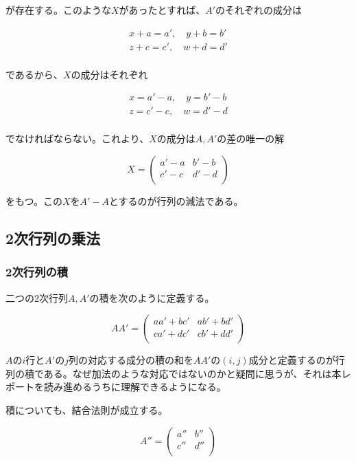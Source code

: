 \documentclass[dvipdfmx,autodetect-engine]{jsarticle}
\begin{document}
が存在する。このような$X$があったとすれば、$A'$のそれぞれの成分は

\begin{eqnarray*}
x + a = a', \quad y + b = b' \\
z + c = c', \quad w + d = d' \\
\end{eqnarray*}

であるから、$X$の成分はそれぞれ

\begin{eqnarray*}
x = a' - a, \quad y = b' - b \\
z = c' - c, \quad w = d' - d \\
\end{eqnarray*}

でなければならない。これより、$X$の成分は$A, A'$の差の唯一の解


$$
X = \begin{pmatrix}
a' - a & b' - b \\
c' - c & d' - d \\
\end{pmatrix}
$$

をもつ。この$X$を$A'-A$とするのが行列の減法である。

\subsection{2次行列の乗法}\label{subsubsection:matrixMultiple}

\subsubsection{2次行列の積}

二つの2次行列$A, A'$の積を次のように定義する。

$$
AA' = \begin{pmatrix}
aa' + bc' & ab' + bd' \\
ca' + dc' & cb' + dd' \\
\end{pmatrix}
$$

$A$の$i$行と$A'$の$j$列の対応する成分の積の和を$AA'$の$(i, j)$成分と定義するのが行列の積である。なぜ加法のような対応ではないのかと疑問に思うが、それは本レポートを読み進めるうちに理解できるようになる。

積についても、結合法則が成立する。

$$
A'' = \begin{pmatrix}
a'' & b'' \\
c'' & d'' \\
\end{pmatrix}
$$
\end{document}
